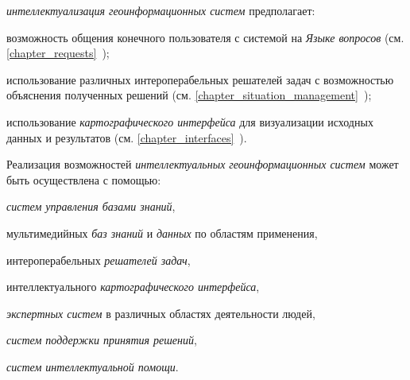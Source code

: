 \textit{интеллектуализация геоинформационных систем} предполагает:
\begin{textitemize}
	\item возможность общения конечного пользователя с системой на \textit{Языке вопросов} (см. \ref{chapter_requests}~);
	\item использование различных интероперабельных решателей задач с возможностью объяснения полученных решений (см. \ref{chapter_situation_management}~); 
	\item использование \textit{картографического интерфейса} для визуализации исходных данных и результатов (см. \ref{chapter_interfaces}~).
\end{textitemize}

Реализация возможностей \textit{интеллектуальных геоинформационных систем} может быть осуществлена с помощью:
\begin{textitemize}
	\item \textit{систем управления базами знаний},
	\item мультимедийных \textit{баз знаний} и \textit{данных} по областям применения,
	\item интероперабельных \textit{решателей задач},
	\item интеллектуального \textit{картографического интерфейса},
	\item \textit{экспертных систем} в различных областях деятельности людей,
	\item \textit{систем поддержки принятия решений},
	\item \textit{систем интеллектуальной помощи}.
\end{textitemize}

